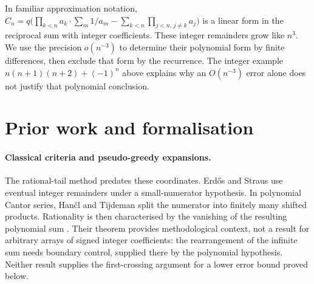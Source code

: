 In familiar approximation notation,
$C_n=q\bigl(\prod_{k<n}a_k\cdot\sum_m1/a_m-\sum_{k<n}\prod_{j<n,\,j\ne k}a_j\bigr)$
is a linear form in the reciprocal sum with integer coefficients.
These integer remainders grow like $n^3$. We use the precision
$o(n^{-3})$ to determine their polynomial form by finite differences,
then exclude that form by the recurrence. The integer example
$n(n+1)(n+2)+(-1)^n$ above explains why an $O(n^{-3})$ error alone
does not justify that polynomial conclusion.

\section{Prior work and formalisation}\label{long243:sec:priorwork}

\paragraph{Classical criteria and pseudo-greedy expansions.}
The rational-tail method predates these coordinates. Erd\H{o}s and Straus
\cite[Theorem~2.1, pp.~85--86]{erdosstraus1974} use eventual integer
remainders under a small-numerator hypothesis. In polynomial Cantor
series, Han\v{c}l and Tijdeman split the numerator into finitely many
shifted products. Rationality is then characterised by the vanishing of
the resulting polynomial sum
\cite[Theorem~2.2 and its proof, pp.~39--40]{hancltijdeman2008}.
Their theorem provides methodological context, not a result for arbitrary
arrays of signed integer coefficients: the rearrangement of the infinite
sum needs boundary control, supplied there by the polynomial hypothesis.
Neither result supplies the first-crossing argument for a lower error
bound proved below.

